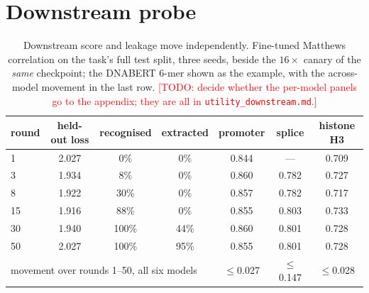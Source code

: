 \documentclass[10pt,letterpaper]{article}
\newcommand{\TODO}[1]{\textcolor{red}{[TODO: #1]}}
\newcommand{\kmer}[1]{#1-mer}
\begin{document}
\section{Downstream probe}

\begin{table}[t]
\centering
\caption{Downstream score and leakage move independently. Fine-tuned Matthews correlation on the
task's full test split, three seeds, beside the $16\times$ canary of the \emph{same} checkpoint; the
DNABERT \kmer{6} shown as the example, with the across-model movement in the last row.
\TODO{decide whether the per-model panels go to the appendix; they are all in
\texttt{utility\_downstream.md}.}}
\label{tab:downstream}
\begin{tabular}{lcccccc}
\toprule
round & held-out loss & recognised & extracted & promoter & splice & histone H3 \\
\midrule
1  & 2.027 & 0\%   & 0\%   & 0.844 & ---   & 0.709 \\
3  & 1.934 & 8\%   & 0\%   & 0.860 & 0.782 & 0.727 \\
8  & 1.922 & 30\%  & 0\%   & 0.857 & 0.782 & 0.717 \\
15 & 1.916 & 88\%  & 0\%   & 0.855 & 0.803 & 0.733 \\
30 & 1.940 & 100\% & 44\%  & 0.860 & 0.801 & 0.728 \\
50 & 2.027 & 100\% & 95\%  & 0.855 & 0.801 & 0.728 \\
\midrule
\multicolumn{4}{l}{movement over rounds 1--50, all six models} & $\le$0.027 & $\le$0.147 & $\le$0.028 \\
\bottomrule
\end{tabular}
\end{table}
\end{document}

